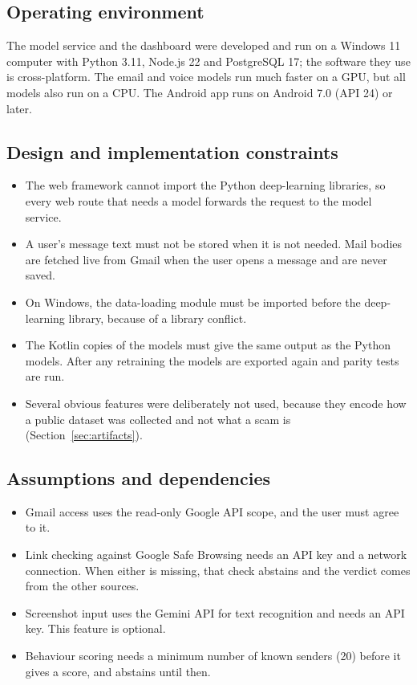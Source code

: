 {\subsection{Operating environment}
The model service and the dashboard were developed and run on a Windows 11 computer with Python 3.11, Node.js 22 and PostgreSQL 17; the software they use is cross-platform. The email and voice models run much faster on a GPU, but all models also run on a CPU. The Android app runs on Android 7.0 (API 24) or later.

\subsection{Design and implementation constraints}
\begin{itemize}
\item The web framework cannot import the Python deep-learning libraries, so every web route that needs a model forwards the request to the model service.
\item A user's message text must not be stored when it is not needed. Mail bodies are fetched live from Gmail when the user opens a message and are never saved.
\item On Windows, the data-loading module must be imported before the deep-learning library, because of a library conflict.
\item The Kotlin copies of the models must give the same output as the Python models. After any retraining the models are exported again and parity tests are run.
\item Several obvious features were deliberately not used, because they encode how a public dataset was collected and not what a scam is (Section~\ref{sec:artifacts}).
\end{itemize}

\subsection{Assumptions and dependencies}
\begin{itemize}
\item Gmail access uses the read-only Google API scope, and the user must agree to it.
\item Link checking against Google Safe Browsing needs an API key and a network connection. When either is missing, that check abstains and the verdict comes from the other sources.
\item Screenshot input uses the Gemini API for text recognition and needs an API key. This feature is optional.
\item Behaviour scoring needs a minimum number of known senders (20) before it gives a score, and abstains until then.
\end{itemize}

}
